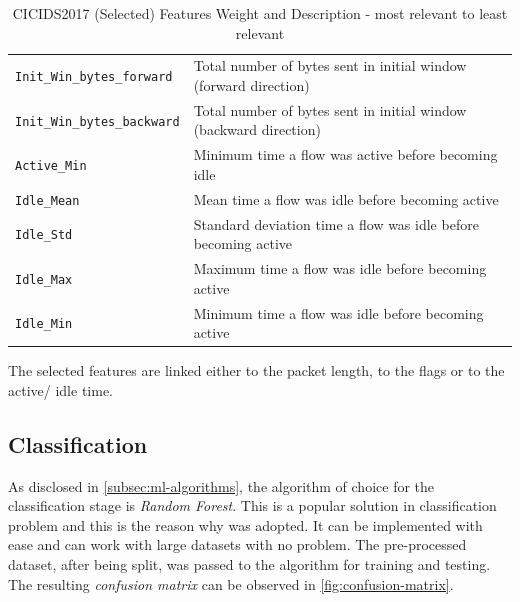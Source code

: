 \begin{table}[h!]
\begin{tabular}{l|l}
        \rowcolor{black!10} \texttt{Init\_Win\_bytes\_forward} & Total number of bytes sent in initial window (forward direction) \\
        \texttt{Init\_Win\_bytes\_backward} & Total number of bytes sent in initial window (backward direction) \\
        \rowcolor{black!10} \texttt{Active\_Min} & Minimum time a flow was active before becoming idle \\
        \texttt{Idle\_Mean} & Mean time a flow was idle before becoming active \\
        \rowcolor{black!10} \texttt{Idle\_Std} & Standard deviation time a flow was idle before becoming active \\
        \texttt{Idle\_Max} & Maximum time a flow was idle before becoming active \\
        \rowcolor{black!10} \texttt{Idle\_Min} & Minimum time a flow was idle before becoming active \\
        \bottomrule
    \end{tabular}
    \caption{CICIDS2017 (Selected) Features Weight and Description - most relevant to least relevant}
    \label{tab:features-weight}
\end{table}

\noindent The selected features are linked either to the packet length, to the flags or to the active/ idle time.



\subsection{Classification}
\label{subsec:classification}

As disclosed in \ref{subsec:ml-algorithms}, the algorithm of choice for the classification stage is \textit{Random Forest}. This is a popular solution in classification problem and this is the reason why was adopted. It can be implemented with ease and can work with large datasets with no problem. The pre-processed dataset, after being split, was passed to the algorithm for training and testing. The resulting \textit{confusion matrix} can be observed in \ref{fig:confusion-matrix}.

